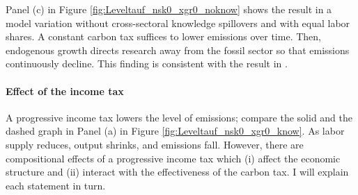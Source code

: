 



Panel (c) in Figure \ref{fig:Leveltauf_nsk0_xgr0_noknow} shows the result in a model variation without cross-sectoral knowledge spillovers and with equal labor shares. A constant carbon tax suffices to lower emissions over time. Then, endogenous growth directs research away from the fossil sector so that emissions continuously decline.  This finding is consistent with the result in \cite{Acemoglu2012TheChange}. %

\paragraph{Effect of the income tax}

A progressive income tax lowers the level of emissions; compare the solid and the dashed graph in Panel (a) in Figure \ref{fig:Leveltauf_nsk0_xgr0_know}. As labor supply reduces, output shrinks, and emissions fall. 
However, there are compositional effects of a progressive income tax which (i) affect the economic structure and (ii) interact with the effectiveness of the carbon tax. I will explain each statement in turn. 

